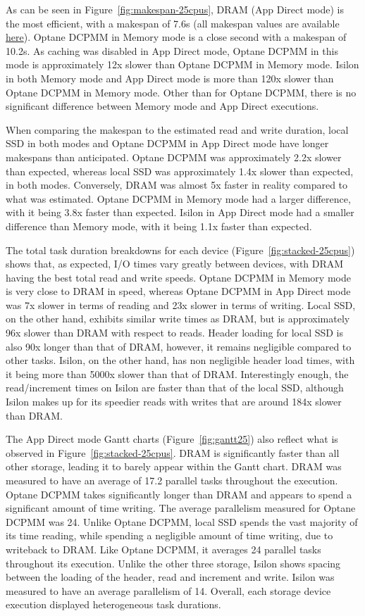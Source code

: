 \documentclass[conference]{IEEEtran}
\begin{document}
As can be seen in Figure~\ref{fig:makespan-25cpus}, DRAM (App Direct mode) is the 
most efficient, with a makespan of 7.6s (all makespan values are available \href{https://github.com/big-data-lab-team/paper-memory-storage/blob/master/experiments/bigbrain-incrementation/results/makespan.csv}{here}).
Optane DCPMM in Memory mode is a close second
with a makespan of 10.2s. As caching was disabled in App Direct mode, 
Optane DCPMM in this mode is approximately 
12x slower than Optane DCPMM in Memory mode. Isilon in both Memory mode and App Direct 
mode is more than 120x slower than Optane DCPMM in Memory mode. Other than for Optane DCPMM, 
there is no significant difference between Memory mode and App Direct executions.

When comparing the makespan to the estimated read and write duration, local SSD
in both modes and Optane DCPMM in App Direct mode have longer makespans than anticipated.
Optane DCPMM was approximately 2.2x slower than expected, whereas local SSD was approximately
1.4x slower than expected, in both modes. Conversely,
DRAM was almost 5x faster in reality compared to what was estimated. Optane DCPMM in Memory mode
had a larger difference, with it being 3.8x faster than expected. Isilon in App Direct
mode had a smaller difference than Memory mode, with it being 1.1x faster than expected.


The total task duration breakdowns for each device (Figure~\ref{fig:stacked-25cpus})
shows that, as expected, I/O times vary greatly between devices, with DRAM having the
best total read and write speeds. Optane DCPMM in Memory mode is very close to DRAM in speed,
whereas Optane DCPMM in App Direct mode was 7x slower in terms of reading and 23x slower in terms
of writing. Local SSD, on the other hand, exhibits similar write times as DRAM, but is
approximately 96x slower than DRAM with respect to reads. Header loading for local SSD is also 90x longer
than that of DRAM, however, it remains negligible compared to other tasks. Isilon, on the 
other hand, has non negligible header load times, with it being more than 5000x
slower than that of DRAM. Interestingly enough, the read/increment times on Isilon are
faster than that of the local SSD, although Isilon makes up for its speedier reads with 
writes that are around 184x slower than DRAM.


The App Direct mode Gantt charts (Figure~\ref{fig:gantt25}) also reflect what is observed in Figure~\ref{fig:stacked-25cpus}.
DRAM is significantly faster than all other storage, leading it to barely appear within the Gantt chart.
DRAM was measured to have an average of 17.2 parallel tasks throughout the execution. Optane DCPMM takes
significantly longer than DRAM and appears to spend a significant amount of time writing. The average
parallelism measured for Optane DCPMM was 24. Unlike Optane DCPMM, local SSD spends the vast majority of its time
reading, while spending a negligible amount of time writing, due to writeback to DRAM. Like Optane DCPMM, it averages 24 parallel tasks
throughout its execution. Unlike the other three storage, Isilon shows spacing between the loading of the header,
read and increment and write. Isilon was measured to have an average parallelism of 14. Overall, each storage device
execution displayed heterogeneous task durations.
\end{document}
